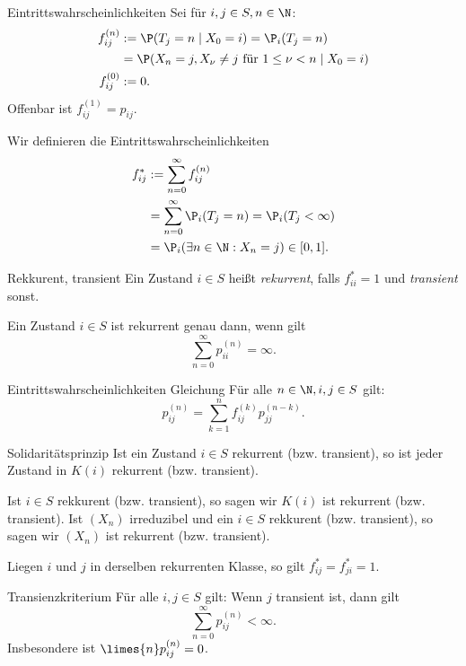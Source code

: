 \begin{karte}{Eintrittswahrscheinlichkeiten}
    Sei für \(i,j\in S, n\in\N\): 
    \begin{align*}
        f_{ij}^{(n)} &:= \P(T_j = n \;|\; X_0 = i) = \P_i(T_j = n) \\
        &= \P(X_n = j, X_\nu \neq j \text{ für } 1 \leq \nu < n \;|\; X_0 = i) \\
        f_{ij}^{(0)} &:= 0.
    \end{align*}
    Offenbar ist \(f_{ij}^{(1)} = p_{ij}\).

    Wir definieren die Eintrittswahrscheinlichkeiten 
    \begin{align*}
        f_{ij}^* &:= \sum_{n=0}^\infty f_{ij}^{(n)} \\
        &= \sum_{n=0}^\infty \P_i(T_j = n) = \P_i(T_j < \infty) \\
        &= \P_i(\exists n\in \N: X_n = j) \in [0,1].
    \end{align*}
\end{karte}

\begin{karte}{Rekkurent, transient}
    Ein Zustand \(i\in S\) heißt \textit{rekurrent}, falls 
    \(f_{ii}^* = 1\) und \textit{transient} sonst.

    Ein Zustand \(i\in S\) ist rekurrent genau dann, wenn gilt 
    \[ \sum_{n=0}^\infty p_{ii}^{(n)} = \infty. \]
\end{karte}

\begin{karte}{Eintrittswahrscheinlichkeiten Gleichung}
    Für alle \(n\in \N, i,j\in S\) gilt: 
    \[ p_{ij}^{(n)} = \sum_{k=1}^n f_{ij}^{(k)} p_{jj}^{(n-k)}. \]
\end{karte}

\begin{karte}{Solidaritätsprinzip}
    Ist ein Zustand \(i\in S\) rekurrent (bzw. transient), so ist 
    jeder Zustand in \(K(i)\) rekurrent (bzw. transient).

    Ist \(i \in S\) rekkurent (bzw. transient), so sagen wir 
    \(K(i)\) ist rekurrent (bzw. transient). 
    Ist \((X_n)\) irreduzibel und ein \(i \in S\) rekkurent (bzw. transient), 
    so sagen wir \((X_n)\) ist rekurrent (bzw. transient).

    Liegen \(i\) und \(j\) in derselben rekurrenten Klasse, 
    so gilt \( f_{ij}^* = f_{ji}^* = 1 \).
\end{karte}

\begin{karte}{Transienzkriterium}
    Für alle \(i,j \in S\) gilt: Wenn \(j\) transient ist, dann gilt 
    \[ \sum_{n=0}^\infty p_{ij}^{(n)} < \infty. \]
    Insbesondere ist \(\limes{n} p_{ij}^{(n)} = 0\).
\end{karte}

